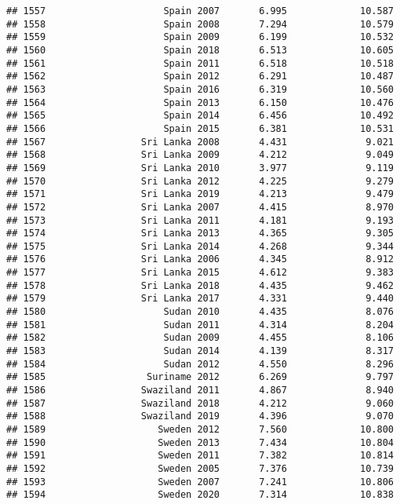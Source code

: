 \documentclass[
]{article}
\begin{document}
\begin{verbatim}
## 1557                     Spain 2007       6.995             10.587
## 1558                     Spain 2008       7.294             10.579
## 1559                     Spain 2009       6.199             10.532
## 1560                     Spain 2018       6.513             10.605
## 1561                     Spain 2011       6.518             10.518
## 1562                     Spain 2012       6.291             10.487
## 1563                     Spain 2016       6.319             10.560
## 1564                     Spain 2013       6.150             10.476
## 1565                     Spain 2014       6.456             10.492
## 1566                     Spain 2015       6.381             10.531
## 1567                 Sri Lanka 2008       4.431              9.021
## 1568                 Sri Lanka 2009       4.212              9.049
## 1569                 Sri Lanka 2010       3.977              9.119
## 1570                 Sri Lanka 2012       4.225              9.279
## 1571                 Sri Lanka 2019       4.213              9.479
## 1572                 Sri Lanka 2007       4.415              8.970
## 1573                 Sri Lanka 2011       4.181              9.193
## 1574                 Sri Lanka 2013       4.365              9.305
## 1575                 Sri Lanka 2014       4.268              9.344
## 1576                 Sri Lanka 2006       4.345              8.912
## 1577                 Sri Lanka 2015       4.612              9.383
## 1578                 Sri Lanka 2018       4.435              9.462
## 1579                 Sri Lanka 2017       4.331              9.440
## 1580                     Sudan 2010       4.435              8.076
## 1581                     Sudan 2011       4.314              8.204
## 1582                     Sudan 2009       4.455              8.106
## 1583                     Sudan 2014       4.139              8.317
## 1584                     Sudan 2012       4.550              8.296
## 1585                  Suriname 2012       6.269              9.797
## 1586                 Swaziland 2011       4.867              8.940
## 1587                 Swaziland 2018       4.212              9.060
## 1588                 Swaziland 2019       4.396              9.070
## 1589                    Sweden 2012       7.560             10.800
## 1590                    Sweden 2013       7.434             10.804
## 1591                    Sweden 2011       7.382             10.814
## 1592                    Sweden 2005       7.376             10.739
## 1593                    Sweden 2007       7.241             10.806
## 1594                    Sweden 2020       7.314             10.838

\end{verbatim}
\end{document}
